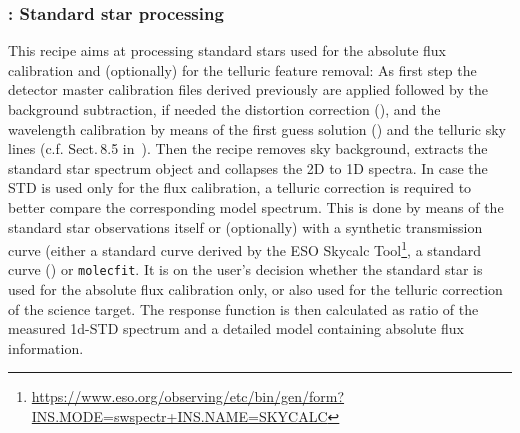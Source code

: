 

\clearpage
\subsubsection{:  Standard star processing}\label{rec:metis_lm_lss_std}
This recipe aims at processing standard stars used for the absolute flux calibration and (optionally) for the telluric feature removal: As first step the detector master calibration files derived previously are applied followed by the background subtraction, if needed the distortion correction (), and
the wavelength calibration by means of the first guess solution () and the telluric sky lines (c.f. Sect.\,8.5 in~\cite{DRLS}). Then the recipe removes sky background, extracts the standard star spectrum object and collapses the 2D to 1D spectra. In case the \ac{STD} is used only for the flux calibration, a telluric correction is required to better compare the corresponding model spectrum. This is done by means of the standard star observations itself or (optionally) with a synthetic transmission curve (either a standard curve derived by the ESO Skycalc Tool\footnote{\url{https://www.eso.org/observing/etc/bin/gen/form?INS.MODE=swspectr+INS.NAME=SKYCALC}}, a standard curve () or \texttt{molecfit}. It is on the user's decision whether the standard star is used for the absolute flux calibration only, or also used for the telluric correction of the science target. The response function is then calculated as ratio of the measured 1d-\ac{STD} spectrum and a detailed model containing absolute flux information.



